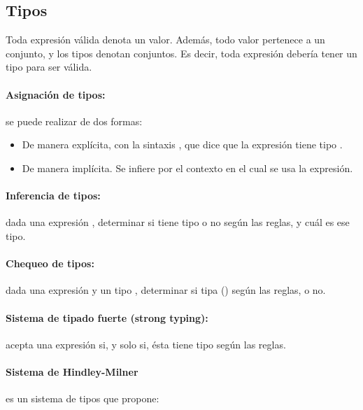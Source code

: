 \subsection{Tipos}

Toda expresión válida denota un valor. Además, todo valor pertenece a un conjunto, y los tipos denotan conjuntos.
Es decir, toda expresión debería tener un tipo para ser válida.

\paragraph{Asignación de tipos:} se puede realizar de dos formas:

\begin{itemize}
  \item De manera explícita, con la sintaxis , que dice que la expresión  tiene tipo .
  \item De manera implícita. Se infiere por el contexto en el cual se usa la expresión.
\end{itemize}

\paragraph{Inferencia de tipos:} dada una expresión , determinar si tiene tipo o no según las reglas, y cuál es ese tipo.

\paragraph{Chequeo de tipos:} dada una expresión  y un tipo , determinar si  tipa  () según las reglas, o no.

\paragraph{Sistema de tipado fuerte (strong typing):} acepta una expresión si, y solo si, ésta tiene tipo según las reglas.

\paragraph{Sistema de Hindley-Milner} es un sistema de tipos que propone:

